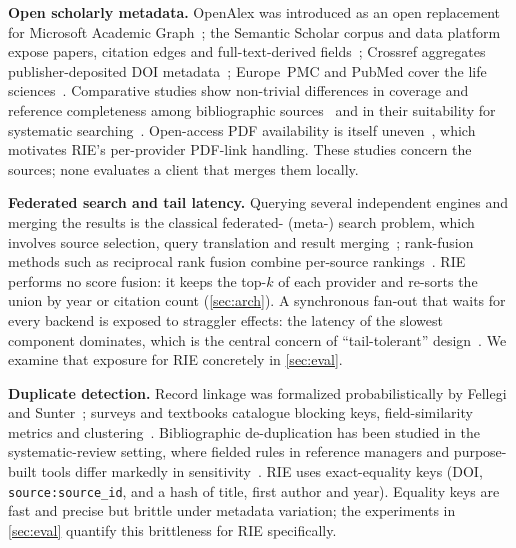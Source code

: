 \documentclass[conference]{IEEEtran}
\newcommand{\code}[1]{\texttt{\small #1}}
\newcommand{\RIE}{RIE}
\begin{document}
\textbf{Open scholarly metadata.} OpenAlex was introduced as an open replacement for Microsoft Academic Graph~\cite{priem2022openalex}; the Semantic Scholar corpus and data platform expose papers, citation edges and full-text-derived fields~\cite{lo2020s2orc,kinney2023semantic}; Crossref aggregates publisher-deposited DOI metadata~\cite{hendricks2020crossref}; Europe~PMC and PubMed cover the life sciences~\cite{ferguson2021europepmc,sayers2022eutilities}. Comparative studies show non-trivial differences in coverage and reference completeness among bibliographic sources~\cite{visser2021large,alperin2024analysis} and in their suitability for systematic searching~\cite{gusenbauer2020which}. Open-access PDF availability is itself uneven~\cite{piwowar2018state}, which motivates \RIE's per-provider PDF-link handling. These studies concern the sources; none evaluates a client that merges them locally.

\textbf{Federated search and tail latency.} Querying several independent engines and merging the results is the classical federated- (meta-) search problem, which involves source selection, query translation and result merging~\cite{shokouhi2011federated}; rank-fusion methods such as reciprocal rank fusion combine per-source rankings~\cite{cormack2009reciprocal}. \RIE{} performs no score fusion: it keeps the top-$k$ of each provider and re-sorts the union by year or citation count (\cref{sec:arch}). A synchronous fan-out that waits for every backend is exposed to straggler effects: the latency of the slowest component dominates, which is the central concern of ``tail-tolerant'' design~\cite{dean2013tail}. We examine that exposure for \RIE{} concretely in \cref{sec:eval}.

\textbf{Duplicate detection.} Record linkage was formalized probabilistically by Fellegi and Sunter~\cite{fellegi1969theory}; surveys and textbooks catalogue blocking keys, field-similarity metrics and clustering~\cite{elmagarmid2007duplicate,christen2012data}. Bibliographic de-duplication has been studied in the systematic-review setting, where fielded rules in reference managers and purpose-built tools differ markedly in sensitivity~\cite{bramer2016dedup,rathbone2015better}. \RIE{} uses exact-equality keys (DOI, \code{source:source\_id}, and a hash of title, first author and year). Equality keys are fast and precise but brittle under metadata variation; the experiments in \cref{sec:eval} quantify this brittleness for \RIE{} specifically.
\end{document}
